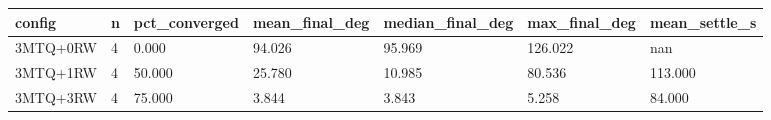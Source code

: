 \begin{tabular}{lllllll}
\hline
config & n & pct\_converged & mean\_final\_deg & median\_final\_deg & max\_final\_deg & mean\_settle\_s \\
\hline
3MTQ+0RW & 4 & 0.000 & 94.026 & 95.969 & 126.022 & nan \\
3MTQ+1RW & 4 & 50.000 & 25.780 & 10.985 & 80.536 & 113.000 \\
3MTQ+3RW & 4 & 75.000 & 3.844 & 3.843 & 5.258 & 84.000 \\
\hline
\end{tabular}
